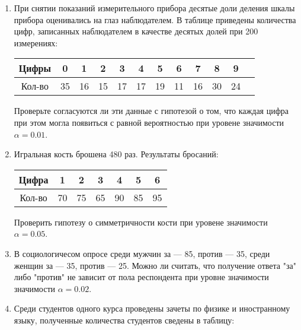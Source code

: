 \documentclass[a4paper,12pt]{article}
\begin{document}
    \begin{enumerate}[topsep=1cm, parsep=1cm, resume]
        \item При снятии показаний измерительного прибора десятые доли деления шкалы прибора оценивались на глаз наблюдателем.
              В таблице приведены количества цифр, записанных наблюдателем в качестве десятых долей при 200 измерениях:

              \begin{center}
                  \begin{tabular}{|c|c|c|c|c|c|c|c|c|c|c|c|}
                      \hline
                      Цифры  & 0  & 1  & 2  & 3  & 4  & 5  & 6  & 7  & 8  & 9  \\
                      \hline
                      Кол-во & 35 & 16 & 15 & 17 & 17 & 19 & 11 & 16 & 30 & 24 \\
                      \hline
                  \end{tabular}
              \end{center}

              Проверьте согласуются ли эти данные с гипотезой о том, что каждая цифра при этом могла появиться с равной вероятностью при уровене значимости $\alpha = 0.01$.

        \item Игральная кость брошена 480 раз. Результаты бросаний:
              \begin{center}
                  \begin{tabular}{|c|c|c|c|c|c|c|}
                      \hline
                      Цифра  & 1  & 2  & 3  & 4  & 5  & 6  \\
                      \hline
                      Кол-во & 70 & 75 & 65 & 90 & 85 & 95 \\
                      \hline
                  \end{tabular}
              \end{center}
              Проверить гипотезу о симметричности кости при уровене значимости $\alpha = 0.05$.

        \item В социологичесом опросе среди мужчин за --- 85, против --- 35, среди женщин за --- 35, против --- 25. Можно ли считать, что
              получение ответа "за"{} либо "против"{} не зависит от пола респондента при уровне значимости значимости $\alpha = 0.02$.

        \item Среди студентов одного курса проведены зачеты по физике и иностранному языку, полученные количества студентов сведены в таблицу:


\end{enumerate}
\end{document}
